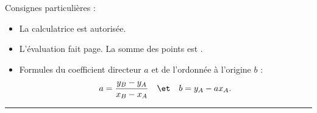 

\SetDate[25/03/2026]

\reversemarginpar
\setlength{\marginparsep}{.5cm}


\pagestyle{fancy}
\fancyhead[R]{\today}

Consignes particulières : 
\begin{itemize}[label=$\bullet$]
	\item 
	La calculatrice est {autorisée}.
	\item
	L'évaluation fait \pageref{lastpage} page. La somme des points est .
	\item
	Formules du coefficient directeur $a$ et de l'ordonnée à l'origine $b$ :
	\begin{align*}
		a = \dfrac{y_B-y_A}{x_B-x_A} && \et && b =y_A - ax_A.
	\end{align*}
\end{itemize}

\marginpar{[pts]}
\hrule



